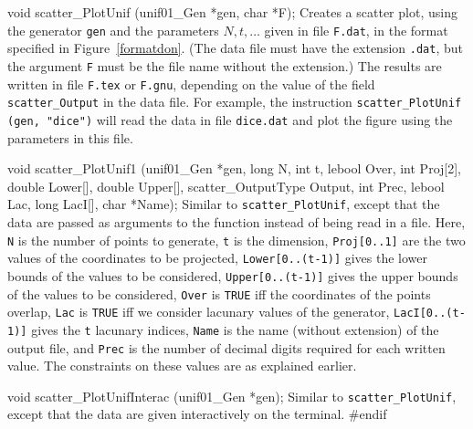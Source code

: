 \fi  %



\code

void scatter_PlotUnif (unif01_Gen *gen, char *F);
\endcode
  \tab Creates a scatter plot, using the generator 
  {\tt gen} and the parameters $N, t, \ldots$ given in file
  {\tt F.dat}, in the format specified in Figure~\ref{formatdon}. 
  (The data file must have the extension {\tt .dat}, but
  the argument {\tt F} must be the file name without the extension.)
  The results are written in file {\tt F.tex} or {\tt F.gnu},
  depending on the value of the field {\tt scatter\_Output} in the
  data file.
  For example, the instruction {\tt scatter\_PlotUnif (gen, "dice")} 
  will read the data in file {\tt dice.dat} and plot the figure using the
  parameters in this file.
 \endtab
\code


void scatter_PlotUnif1 (unif01_Gen *gen, long N, int t, lebool Over,
   int Proj[2], double Lower[], double Upper[], scatter_OutputType Output,
   int Prec, lebool Lac, long LacI[], char *Name);
\endcode
  \tab
  Similar to  {\tt scatter\_PlotUnif}, except that the data are
  passed as arguments to the function instead of being read in a file.
  Here, {\tt N} is the number of points to generate,
  {\tt t} is the dimension,
  {\tt Proj[0..1]} are the two values of the coordinates to be projected,
  {\tt Lower[0..(t-1)]} gives the lower bounds of the values to be considered,
  {\tt Upper[0..(t-1)]} gives the upper bounds of the values to be considered,
  {\tt Over} is  {\tt TRUE} iff the coordinates of the  points overlap,
  {\tt Lac} is  {\tt TRUE} iff we consider lacunary values of the generator,
  {\tt LacI[0..(t-1)]} gives the {\tt t} lacunary indices,
  {\tt Name} is the name (without extension) of the output file, and
  {\tt Prec} is the number of decimal digits required for each written value.
  The constraints on these values are as explained earlier.
 \endtab
\code


void scatter_PlotUnifInterac (unif01_Gen *gen);
\endcode
  \tab Similar to {\tt scatter\_PlotUnif}, except that the data are
   given interactively on the terminal.
 \endtab
\code
\hide
#endif
\endhide
\endcode
